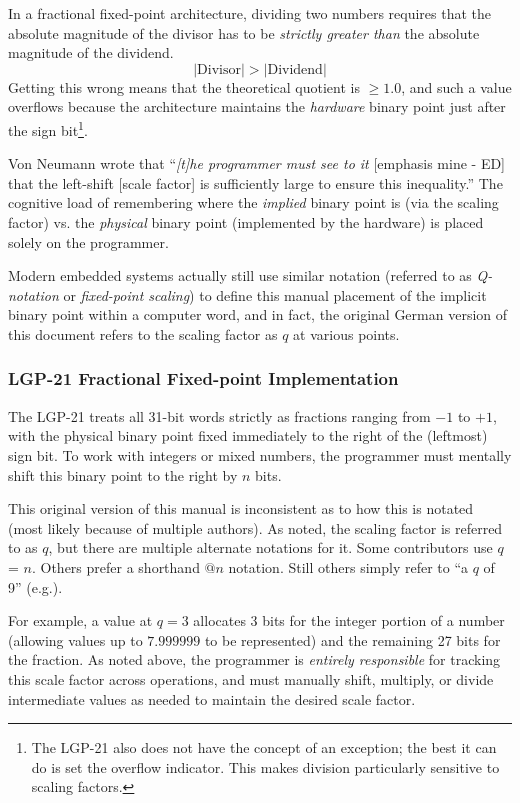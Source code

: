 In a fractional fixed-point architecture, dividing two numbers requires that the absolute magnitude of the divisor has to be \emph{strictly greater than} the absolute magnitude of the dividend.$$\left| \text{Divisor} \right| > \left| \text{Dividend} \right|$$Getting this wrong means that the theoretical quotient is $\ge 1.0$, and such a value overflows because the architecture maintains the \emph{hardware} binary point just after the sign bit\footnote{The LGP-21 also does not have the concept of an exception; the best it can do is set the overflow indicator. This makes division particularly sensitive to scaling factors.}.

Von Neumann wrote that ``\emph{[t]he programmer must see to it} [emphasis mine - ED] that the left-shift [scale factor] is sufficiently large to ensure this inequality.''\cite{burks1946preliminary} The cognitive load of remembering where the \emph{implied} binary point is (via the scaling factor) vs. the \emph{physical} binary point (implemented by the hardware) is placed solely on the programmer.

Modern embedded systems actually still use similar notation (referred to as \emph{Q-notation} or \emph{fixed-point scaling}) to define this manual placement of the implicit binary point within a computer word, and in fact, the original German version of this document refers to the scaling factor as $q$ at various points.

\subsubsection*{LGP-21 Fractional Fixed-point Implementation}
\label{sec:fractional-fixed-point}
The LGP-21 treats all 31-bit words strictly as fractions ranging from $-1$ to $+1$, with the physical binary point fixed immediately to the right of the (leftmost) sign bit. To work with integers or mixed numbers, the programmer must mentally shift this binary point to the right by $n$ bits.

This original version of this manual is inconsistent as to how this is notated (most likely because of multiple authors). As noted, the scaling factor is referred to as $q$, but there are multiple alternate notations for it. Some contributors use $q$ = $n$. Others prefer a shorthand $@n$ notation. Still others simply refer to ``a $q$ of 9'' (e.g.).

For example, a value at $q=3$ allocates 3 bits for the integer portion of a number (allowing values up to $7.999999$ to be represented) and the remaining 27 bits for the fraction. As noted above, the programmer is \emph{entirely responsible} for tracking this scale factor across operations, and must manually shift, multiply, or divide intermediate values as needed to maintain the desired scale factor.

